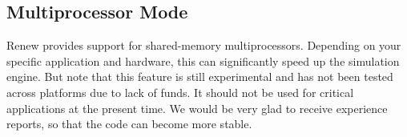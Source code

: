 

%

\subsection{Multiprocessor Mode}
\label{subsec:concsim}

Renew provides support for shared-memory multiprocessors.
Depending on your specific application and hardware, 
this can significantly speed up the
simulation engine. But note that this feature is
still experimental and has not been tested across platforms
due to lack of funds. It should not be used for critical 
applications at the present time. We would be very glad to 
receive experience reports, so that the code can become more 
stable.


